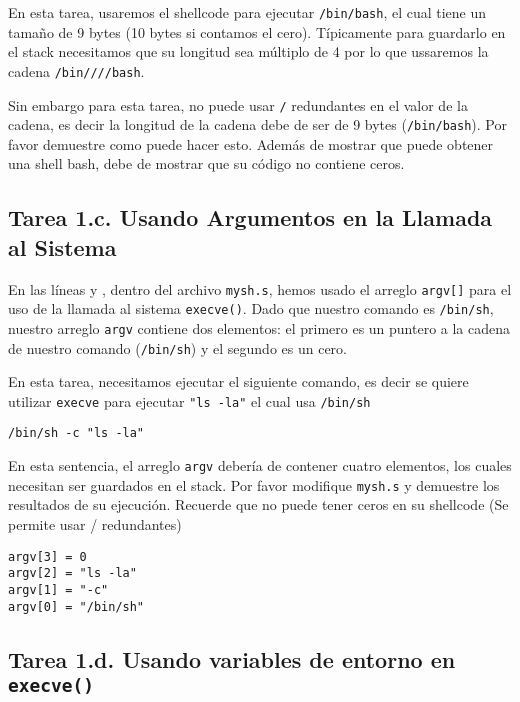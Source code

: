 En esta tarea, usaremos el shellcode para ejecutar \texttt{/bin/bash}, el cual tiene un tamaño de 9 bytes (10 bytes si contamos el cero). Típicamente para guardarlo en el stack necesitamos que su longitud sea múltiplo de 4 por lo que ussaremos la cadena \texttt{/bin////bash}.

Sin embargo para esta tarea, no puede usar \texttt{/} redundantes en el valor de la cadena, es decir la longitud de la cadena debe de ser de 9 bytes (\texttt{/bin/bash}).
Por favor demuestre como puede hacer esto.
Además de mostrar que puede obtener una shell bash, debe de mostrar que su código no contiene ceros.

\subsection{Tarea 1.c. Usando Argumentos en la Llamada al Sistema}
 
En las líneas  y , dentro del archivo \texttt{mysh.s}, hemos usado el arreglo  \texttt{argv[]} para el uso de la llamada al sistema \texttt{execve()}. Dado que nuestro comando es \texttt{/bin/sh}, nuestro arreglo \texttt{argv} contiene dos elementos: el primero es un puntero a la cadena de nuestro comando (\texttt{/bin/sh}) y el segundo es un cero.

En esta tarea, necesitamos ejecutar el siguiente comando, es decir se quiere utilizar \texttt{execve} para ejecutar \texttt{"ls -la"} el cual usa \texttt{/bin/sh}

\begin{lstlisting}
/bin/sh -c "ls -la"
\end{lstlisting}

En esta sentencia, el arreglo \texttt{argv} debería de contener cuatro elementos, los cuales necesitan ser guardados en el stack. Por favor modifique \texttt{mysh.s} y demuestre los resultados de su ejecución. Recuerde que no puede tener ceros en su shellcode (Se permite usar / redundantes)

\begin{lstlisting}
argv[3] = 0
argv[2] = "ls -la"
argv[1] = "-c"
argv[0] = "/bin/sh"
\end{lstlisting}
 


\subsection{Tarea 1.d. Usando variables de entorno en \texttt{execve()}}

